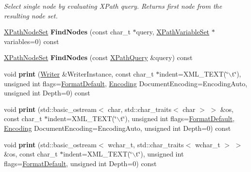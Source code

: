 \begin{DoxyCompactItemize}
\begin{DoxyCompactList}\small\item\em Select single node by evaluating XPath query. Returns first node from the resulting node set. \item\end{DoxyCompactList}\item 
\hypertarget{classphys_1_1xml_1_1Node_a7390ba1c09b83544365abc7bf8ec5b8f}{
\hyperlink{classphys_1_1xml_1_1XPathNodeSet}{XPathNodeSet} {\bfseries FindNodes} (const char\_\-t $\ast$query, \hyperlink{classphys_1_1xml_1_1XPathVariableSet}{XPathVariableSet} $\ast$variables=0) const }
\label{d7/d0a/classphys_1_1xml_1_1Node_a7390ba1c09b83544365abc7bf8ec5b8f}

\item 
\hypertarget{classphys_1_1xml_1_1Node_a466766bf750da2a04acd8a32d2b8a458}{
\hyperlink{classphys_1_1xml_1_1XPathNodeSet}{XPathNodeSet} {\bfseries FindNodes} (const \hyperlink{classphys_1_1xml_1_1XPathQuery}{XPathQuery} \&query) const }
\label{d7/d0a/classphys_1_1xml_1_1Node_a466766bf750da2a04acd8a32d2b8a458}

\item 
\hypertarget{classphys_1_1xml_1_1Node_afc379515f3cb75cebe9e0192d577117b}{
void {\bfseries print} (\hyperlink{classphys_1_1xml_1_1Writer}{Writer} \&WriterInstance, const char\_\-t $\ast$indent=XML\_\-TEXT(\char`\"{}$\backslash$t\char`\"{}), unsigned int flags=\hyperlink{namespacephys_1_1xml_a08bf6aab51f79929d9097706a5e64408}{FormatDefault}, \hyperlink{namespacephys_1_1xml_a420f5de782438f88160321385bea2015}{Encoding} DocumentEncoding=EncodingAuto, unsigned int Depth=0) const }
\label{d7/d0a/classphys_1_1xml_1_1Node_afc379515f3cb75cebe9e0192d577117b}

\item 
\hypertarget{classphys_1_1xml_1_1Node_a5a961842546be8e2628bd5c94b422502}{
void {\bfseries print} (std::basic\_\-ostream$<$ char, std::char\_\-traits$<$ char $>$ $>$ \&os, const char\_\-t $\ast$indent=XML\_\-TEXT(\char`\"{}$\backslash$t\char`\"{}), unsigned int flags=\hyperlink{namespacephys_1_1xml_a08bf6aab51f79929d9097706a5e64408}{FormatDefault}, \hyperlink{namespacephys_1_1xml_a420f5de782438f88160321385bea2015}{Encoding} DocumentEncoding=EncodingAuto, unsigned int Depth=0) const }
\label{d7/d0a/classphys_1_1xml_1_1Node_a5a961842546be8e2628bd5c94b422502}

\item 
\hypertarget{classphys_1_1xml_1_1Node_a0410fe722c4cd5037de11c7062fb5ee0}{
void {\bfseries print} (std::basic\_\-ostream$<$ wchar\_\-t, std::char\_\-traits$<$ wchar\_\-t $>$ $>$ \&os, const char\_\-t $\ast$indent=XML\_\-TEXT(\char`\"{}$\backslash$t\char`\"{}), unsigned int flags=\hyperlink{namespacephys_1_1xml_a08bf6aab51f79929d9097706a5e64408}{FormatDefault}, unsigned int Depth=0) const }
\label{d7/d0a/classphys_1_1xml_1_1Node_a0410fe722c4cd5037de11c7062fb5ee0}


\end{DoxyCompactItemize}
